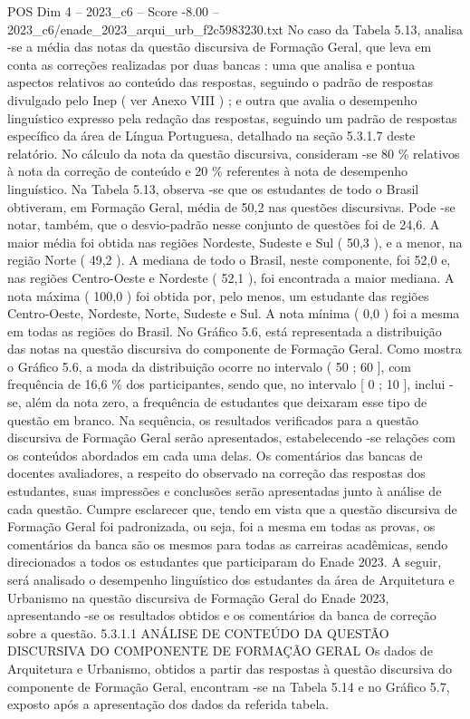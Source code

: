 \begin{textsample}{POS Dim 4 – 2023\_c6 – Score -8.00 – 2023\_c6/enade\_2023\_arqui\_urb\_f2c5983230.txt}
No caso da Tabela 5.13, analisa -se a média das notas da questão discursiva de Formação Geral, que leva em conta as correções realizadas por duas bancas : uma que analisa e pontua aspectos relativos ao conteúdo das respostas, seguindo o padrão de respostas divulgado pelo Inep ( ver Anexo VIII ) ; e outra que avalia o desempenho linguístico expresso pela redação das respostas, seguindo um padrão de respostas específico da área de Língua Portuguesa, detalhado na seção 5.3.1.7 deste relatório.
No cálculo da nota da questão discursiva, consideram -se 80 \% relativos à nota da correção de conteúdo e 20 \% referentes à nota de desempenho linguístico.
Na Tabela 5.13, observa -se que os estudantes de todo o Brasil obtiveram, em Formação Geral, média de 50,2 nas questões discursivas.
Pode -se notar, também, que o desvio-padrão nesse conjunto de questões foi de 24,6.
A maior média foi obtida nas regiões Nordeste, Sudeste e Sul ( 50,3 ), e a menor, na região Norte ( 49,2 ).
A mediana de todo o Brasil, neste componente, foi 52,0 e, nas regiões Centro-Oeste e Nordeste ( 52,1 ), foi encontrada a maior mediana.
A nota máxima ( 100,0 ) foi obtida por, pelo menos, um estudante das regiões Centro-Oeste, Nordeste, Norte, Sudeste e Sul.
A nota mínima ( 0,0 ) foi a mesma em todas as regiões do Brasil.
No Gráfico 5.6, está representada a distribuição das notas na questão discursiva do componente de Formação Geral.
Como mostra o Gráfico 5.6, a moda da distribuição ocorre no intervalo ( 50 ; 60 ], com frequência de 16,6 \% dos participantes, sendo que, no intervalo [ 0 ; 10 ], inclui -se, além da nota zero, a frequência de estudantes que deixaram esse tipo de questão em branco.
Na sequência, os resultados verificados para a questão discursiva de Formação Geral serão apresentados, estabelecendo -se relações com os conteúdos abordados em cada uma delas.
Os comentários das bancas de docentes avaliadores, a respeito do observado na correção das respostas dos estudantes, suas impressões e conclusões serão apresentadas junto à análise de cada questão.
Cumpre esclarecer que, tendo em vista que a questão discursiva de Formação Geral foi padronizada, ou seja, foi a mesma em todas as provas, os comentários da banca são os mesmos para todas as carreiras acadêmicas, sendo direcionados a todos os estudantes que participaram do Enade 2023.
A seguir, será analisado o desempenho linguístico dos estudantes da área de Arquitetura e Urbanismo na questão discursiva de Formação Geral do Enade 2023, apresentando -se os resultados obtidos e os comentários da banca de correção sobre a questão. 5.3.1.1 ANÁLISE DE CONTEÚDO DA QUESTÃO DISCURSIVA DO COMPONENTE DE FORMAÇÃO GERAL Os dados de Arquitetura e Urbanismo, obtidos a partir das respostas à questão discursiva do componente de Formação Geral, encontram -se na Tabela 5.14 e no Gráfico 5.7, exposto após a apresentação dos dados da referida tabela.

\end{textsample}
